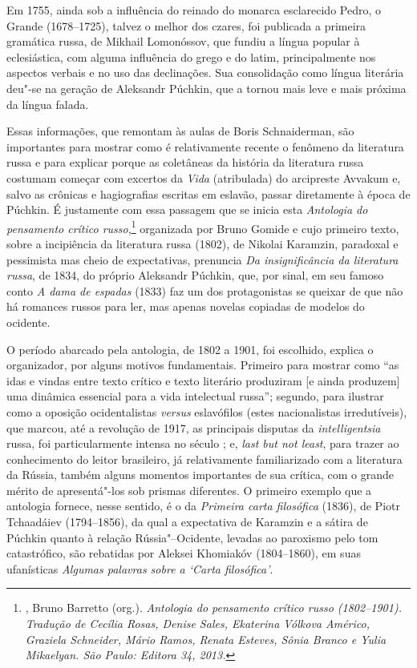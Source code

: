 {Em 1755, ainda sob a influência do reinado do monarca esclarecido Pedro, o
Grande (1678--1725), talvez o melhor dos czares, foi publicada a primeira
gramática russa, de Mikhail Lomonóssov, que fundiu a língua popular à
eclesiástica, com alguma influência do grego e do latim,
 principalmente nos aspectos verbais e no uso das declinações. Sua
consolidação como língua literária deu"-se na geração de Aleksandr Púchkin, que a tornou mais leve e mais
próxima da língua falada.

Essas informações, que remontam às aulas de Boris Schnaiderman, são
importantes para mostrar como é relativamente recente o fenômeno da
literatura russa e para explicar porque as coletâneas da história
da literatura russa costumam começar com excertos da \emph{Vida} (atribulada) do arcipreste Avvakum e, salvo as crônicas e hagiografias
escritas em eslavão, passar diretamente à época de Púchkin. É
justamente com essa passagem que se inicia esta \emph{Antologia do
pensamento crítico russo},\footnote{, Bruno Barretto
 (org.). \emph{Antologia do pensamento crítico russo (1802--1901).
 Tradução de Cecília Rosas, Denise Sales, Ekaterina Vólkova Américo,
 Graziela Schneider, Mário Ramos, Renata Esteves, Sônia Branco e Yulia
 Mikaelyan. São Paulo: Editora 34, 2013.}} organizada por Bruno Gomide e cujo
primeiro texto, sobre a incipiência da literatura russa (1802), de
Nikolai Karamzin, paradoxal e pessimista mas cheio de expectativas,
prenuncia \emph{Da insignificância da literatura russa}, de 1834, do
próprio Aleksandr Púchkin, que, por sinal, em seu famoso conto \emph{A dama
de espadas} (1833) faz um dos protagonistas se queixar de que não há romances
russos para ler, mas apenas novelas copiadas de modelos do ocidente.

O período abarcado pela antologia, de 1802 a 1901, foi escolhido, explica o
organizador, por alguns motivos fundamentais. Primeiro para mostrar como
``as idas e vindas entre texto crítico e texto literário produziram [e ainda produzem] uma dinâmica essencial para a vida intelectual
russa''; segundo, para ilustrar como a oposição ocidentalistas \emph{versus}
eslavófilos (estes nacionalistas irredutíveis), que marcou, até a revolução
de 1917, as principais disputas da \emph{intelligentsia} russa, foi
particularmente intensa no século ; e, \emph{last but not least}, para
trazer ao conhecimento do leitor brasileiro, já relativamente
familiarizado com a literatura da Rússia, também alguns momentos
importantes de sua crítica, com o grande mérito de apresentá"-los sob
prismas diferentes. O primeiro exemplo que a antologia fornece, nesse sentido, é o da \emph{Primeira carta filosófica} (1836),
 de Piotr Tchaadáiev (1794--1856), da qual a
expectativa de Karamzin e a sátira de Púchkin quanto à relação
Rússia"--Ocidente, levadas ao paroxismo pelo tom catastrófico, são
rebatidas por Aleksei Khomiakóv (1804--1860), em suas ufanísticas \emph{Algumas
palavras sobre a `Carta filosófica'}.

}

